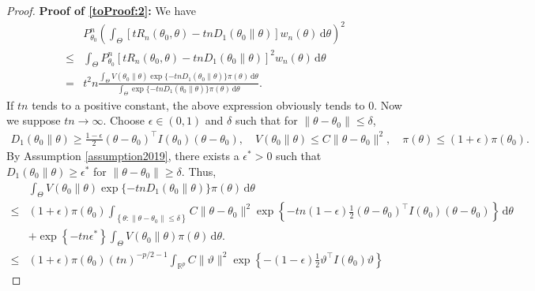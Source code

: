 \documentclass[11pt]{article}
\theoremstyle{plain}
\theoremstyle{definition}
\theoremstyle{remark}
\begin{document}
\begin{appendices}
\begin{proof}
\noindent\textbf{Proof of \eqref{toProof:2}:}
We have
\begin{align*}
    &
    P_{\theta_0}^n
    \left( 
    \int_{\Theta}
    \left[   t R_n(\theta_0, \theta) - tn D_1 (\theta_0 \| \theta )  \right]
    w_n (\theta) \, \mathrm d \theta
    \right)^2
    \\
    \leq&
    \int_{\Theta}
    P_{\theta_0}^n
    \left[   t R_n(\theta_0, \theta) - tn D_1 (\theta_0 \| \theta )  \right]^2
    w_n (\theta) \, \mathrm d \theta
    \\
    =&
        t^2 n
           \frac{
    \int_{\Theta}
     V(\theta_0 \| \theta)
               \exp\{ -t n D_1\left( \theta_0 \| \theta \right) \} \pi(\theta)
     \, \mathrm d \theta
           }{
               \int_{\Theta} \exp\{ -t n D_1\left( \theta_0 \| \theta \right) \} \pi(\theta) \, \mathrm d \theta
           }
           .
\end{align*}
If $tn $ tends to a positive constant, the above expression obviously tends to $0$.
Now we suppose $tn \to \infty$.
Choose $\epsilon \in (0,1)$ and $\delta$ such that  for $\|\theta- \theta_0\| \leq \delta$,
\begin{align*}
    D_1(\theta_0 \| \theta) \geq  \frac{1-\epsilon}{2} (\theta- \theta_0)^\top I(\theta_0) (\theta - \theta_0),
    \quad
    V(\theta_0 \| \theta) \leq C\|\theta - \theta_0\|^2
    ,\quad
    \pi(\theta) \leq (1+\epsilon) \pi(\theta_0)
    .
\end{align*}
By Assumption \ref{assumption2019}, there exists a $\epsilon^* > 0$ such that $D_1(\theta_0 \|\theta) \geq \epsilon^*$ for $\|\theta - \theta_0\| \geq \delta$.
Thus,
\begin{align*}
    &
    \int_{\Theta}
     V(\theta_0 \| \theta)
               \exp\{ -t n D_1\left( \theta_0 \| \theta \right) \} \pi(\theta)
     \, \mathrm d \theta
     \\
     \leq&
    (1+\epsilon) \pi(\theta_0)
     \int_{ \left\{ \theta: \|\theta- \theta_0\| \leq \delta \right\}}
     C\|\theta - \theta_0\|^2
     \exp\left\{ -t n (1-\epsilon) \frac{1}{2} \left( \theta - \theta_0 \right)^\top I(\theta_0) (\theta- \theta_0) \right\} 
     \, \mathrm d \theta
     \\
     &+
     \exp\left\{ -tn \epsilon^* \right\} \int_{\Theta} V(\theta_0 \| \theta) \pi(\theta) \, \mathrm d \theta.
     \\
     \leq&
    (1+\epsilon) \pi(\theta_0)
    (tn)^{-p/2 - 1}
     \int_{ \mathbb R^p}
     C\|\vartheta \|^2
     \exp\left\{ - (1-\epsilon) \frac{1}{2}  \vartheta^\top I(\theta_0) \vartheta \right\} 

\end{align*}
\end{proof}
\end{appendices}
\end{document}
